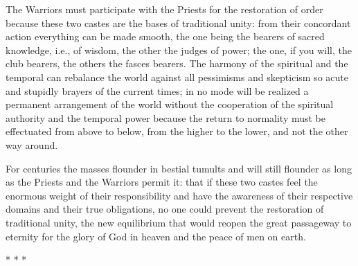 The Warriors must participate with the Priests for the restoration of order because these two castes are the bases of traditional unity: from their concordant action everything can be made smooth, the one being the bearers of sacred knowledge, i.e., of wisdom, the other the judges of power; the one, if you will, the club bearers, the others the fasces bearers. The harmony of the spiritual and the temporal can rebalance the world against all pessimisms and skepticism so acute and stupidly brayers of the current times; in no mode will be realized a permanent arrangement of the world without the cooperation of the spiritual authority and the temporal power because the return to normality must be effectuated from above to below, from the higher to the lower, and not the other way around.

For centuries the masses flounder in bestial tumults and will still flounder as long as the Priests and the Warriors permit it: that if these two castes feel the enormous weight of their responsibility and have the awareness of their respective domains and their true obligations, no one could prevent the restoration of traditional unity, the new equilibrium that would reopen the great passageway to eternity for the glory of God in heaven and the peace of men on earth.


\begin{center}* * *\end{center}

